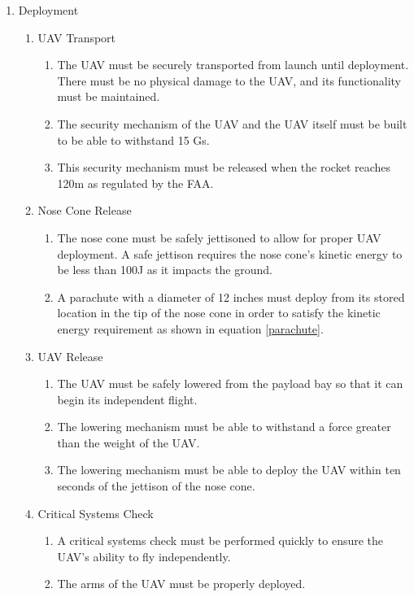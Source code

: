 \begin{enumerate}[noitemsep, label=\arabic*.]
	\item Deployment
	\begin{enumerate}[noitemsep, label=1.\arabic*.]
		\item UAV Transport 
		\begin{enumerate}[noitemsep, label=1.1.\arabic*.]
			\item The UAV must be securely transported from launch until deployment. There must be no physical damage to the UAV, and its functionality must be maintained.
			\item The security mechanism of the UAV and the UAV itself must be built to be able to withstand 15 Gs. 
			\item This security mechanism must be released when the rocket reaches 120m as regulated by the FAA. 
		\end{enumerate}
		\item Nose Cone Release
		\begin{enumerate}[noitemsep, label=1.2.\arabic*.]
			\item The nose cone must be safely jettisoned to allow for proper UAV deployment. A safe jettison requires the nose cone's kinetic energy to be less than 100J as it impacts the ground.
			\item A parachute with a diameter of 12 inches must deploy from its stored location in the tip of the nose cone in order to satisfy the kinetic energy requirement as shown in equation \ref{parachute}.
		\end{enumerate}
		\item UAV Release
		\begin{enumerate}[noitemsep, label=1.3.\arabic*.]
			\item The UAV must be safely lowered from the payload bay so that it can begin its independent flight.
			\item The lowering mechanism must be able to withstand a force greater than the weight of the UAV.
			\item The lowering mechanism must be able to deploy the UAV within ten seconds of the jettison of the nose cone.
		\end{enumerate}
		\item Critical Systems Check
		\begin{enumerate}[noitemsep, label=1.4.\arabic*.]
			\item A critical systems check must be performed quickly to ensure the UAV's ability to fly independently.
			\item The arms of the UAV must be properly deployed.

\end{enumerate}
\end{enumerate}
\end{enumerate}
